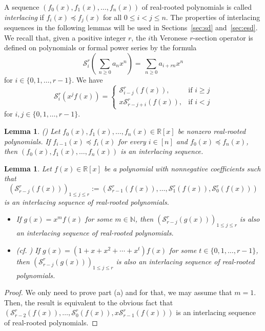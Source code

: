 \documentclass[11pt]{amsart}
\newtheorem{lemma}[theorem]{Lemma}
\newcommand{\sS}{{\mathcal S}}
\newcommand{\RR}{{\mathbb R}}
\newcommand{\NN}{{\mathbb N}}
\begin{document}
A sequence $(f_0(x), f_1(x),\dots,f_n(x))$ of
real-rooted polynomials is called 
\emph{interlacing} if $f_i(x) \preceq f_j(x)$ 
for all $0 \le i < j \le n$. The properties of 
interlacing sequences in the following lemmas 
will be used in Sections~\ref{sec:sd} 
and~\ref{sec:esd}. We recall that, given a 
positive integer $r$, the $i$th Veronese 
$r$-section operator is defined on polynomials
or formal power series by the formula
%
\[ \sS^r_i \left( \, \sum_{n \ge 0} a_nx^n \right) 
   = \, \sum_{n \ge 0} a_{i+rn} x^n \]
%
for $i \in \{0, 1,\dots,r-1\}$. We have
%
\begin{equation} \label{eq:Sx}
\sS^r_i (x^j f(x)) = \begin{cases}
  \sS^r_{i-j} (f(x)), & \text{if $i \ge j$} \\
  x \sS^r_{r-j+i} (f(x)), & \text{if $i < j$} 
\end{cases} \end{equation}
%
for $i, j \in \{0, 1,\dots,r-1\}$.

\begin{lemma} \label{lem:trans}
{\rm (\cite[Proposition~3.3]{Wa92})}
Let $f_0(x), f_1(x),\dots,f_n(x) \in \RR[x]$ be 
nonzero real-rooted polynomials. If $f_{i-1}(x) 
\preceq f_i(x)$ for every $i \in [n]$ and $f_0(x) 
\preceq f_n(x)$, then $(f_0(x), 
f_1(x),\dots,f_n(x))$ is an interlacing sequence.
\end{lemma} 
%
\begin{lemma} \label{lem:zhang} 
Let $f(x) \in \RR[x]$ be a polynomial with 
nonnegative coefficients such that 
%
\[ (\sS^r_{r-j} (f(x)))_{1 \le j \le r} := 
   (\sS^r_{r-1} (f(x)),\dots,\sS^r_1 (f(x)), 
    \sS^r_0 (f(x))) \]
%
is an interlacing sequence of real-rooted 
polynomials.

\begin{itemize}
\itemsep=0pt
\item[{\rm (a)}]
If $g(x) = x^m f(x)$ for some $m \in \NN$, then 
$(\sS^r_{r-j} (g(x)))_{1 \le j \le r}$ is also an 
interlacing sequence of real-rooted polynomials. 

\item[{\rm (b)}] 
{\rm (cf. \cite[Theorem~2.2]{Zh19})} If $g(x) = 
(1 + x + x^2 + \cdots + x^t) f(x)$ for some $t 
\in \{0, 1,\dots,r-1\}$, then $(\sS^r_{r-j} 
(g(x)))_{1 \le j \le r}$ is also an interlacing 
sequence of real-rooted polynomials.
%
\end{itemize}
\end{lemma}

\begin{proof}
We only need to prove part (a) and for that, we
may assume that $m=1$. Then, the result is 
equivalent to the obvious fact that $(\sS^r_{r-2} 
(f(x)),\dots,\sS^r_0 (f(x)), x \sS^r_{r-1} 
(f(x)))$ is an interlacing sequence of real-rooted 
polynomials.
\end{proof}
\end{document}
